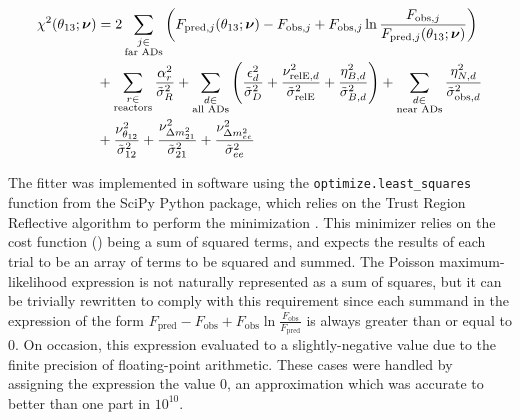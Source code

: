 \begin{align}
    \begin{split}
        \chi^2(\theta_{13};\boldsymbol{\nu}) &=
            2\sum_{\substack{j \in \\\text{far ADs}}}
        \left(
            F_{\text{pred},j}(\theta_{13};\boldsymbol{\nu}) - F_{\text{obs},j}
            + F_{\text{obs},j}\ln
            \frac{F_{\text{obs},j}}{F_{\text{pred},j}(\theta_{13};\boldsymbol{\nu})}
        \right) \\
            &+ \sum_{\substack{r \in \\\text{reactors}}}
                \frac{\alpha_r^2}{\tilde{\sigma}_R^2}
            + \sum_{\substack{d \in \\\text{all ADs}}}
            \left(
                \frac{\epsilon_d^2}{\tilde{\sigma}_D^2}
                + \frac{\nu_{\text{relE},d}^2}{\tilde{\sigma}_{\text{relE}}^2}
                + \frac{\eta_{B,d}^2}{\tilde{\sigma}_{B,d}^2}
            \right)
            + \sum_{\substack{d \in \\\text{near ADs}}}
            \frac{\eta_{N,d}^2}{\tilde{\sigma}^2_{\text{obs},d}} \\
            &+ \frac{\nu_{\theta_{12}}^2}{\tilde{\sigma}_{12}^2}
            + \frac{\nu_{\Delta m^2_{21}}^2}{\tilde{\sigma}_{21}^2}
            + \frac{\nu_{\Delta m^2_{ee}}^2}{\tilde{\sigma}_{ee}^2}
    \end{split}
\end{align}

The fitter was implemented in software using the
\texttt{optimize.least\_squares} function from the SciPy Python package,
which relies on the Trust Region Reflective algorithm
to perform the \chisquare{} minimization \cite{scipy,trf_minimizer}.
This minimizer relies on the cost function (\chisquare{})
being a sum of squared terms,
and expects the results of each trial
to be an array of terms to be squared and summed.
The Poisson maximum-likelihood \chisquare{} expression
is not naturally represented as a sum of squares,
but it can be trivially rewritten to comply with this requirement
since each summand in the \chisquare{} expression of the form
$F_\text{pred}-F_\text{obs}+F_\text{obs}\ln\frac{F_\text{obs}}{F_\text{pred}}$
is always greater than or equal to 0.
On occasion, this expression evaluated to a slightly-negative value
due to the finite precision of floating-point arithmetic.
These cases were handled by assigning the expression the value 0,
an approximation which was accurate to better than one part in $10^{10}$.


